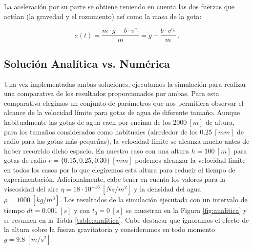 \documentclass[journal]{IEEEtran}
\begin{document}
La aceleración por su parte se obtiene teniendo en cuenta las dos fuerzas que actúan (la gravedad y el rozamiento) así como la masa de la gota:

\begin{equation}
  a(t) = \displaystyle\frac{m\cdot g - b \cdot v^{v_e}}{m} = g - \displaystyle\frac{b\cdot v^{v_e}}{m}~.
\end{equation}

\subsection{Solución Analítica vs. Numérica}

Una vez implementadas ambas soluciones, ejecutamos la simulación para realizar una comparativa de los resultados proporcionados por ambas. Para esta comparativa elegimos un conjunto de parámetros que nos permitiera observar el alcance de la velocidad límite para gotas de agua de diferente tamaño. Aunque habitualmente las gotas de agua caen por encima de los $2000~[m]$ de altura, para los tamaños considerados como habituales \cite{Laws}\cite{Corbert} (alrededor de los $0.25~[mm]$ de radio para
las gotas más pequeñas), la
velocidad límite se alcanza mucho antes de haber recorrido dicho espacio. En nuestro caso con una altura $h = 100~[m]$ para gotas de radio $r = \{0.15, 0.25, 0.30\}~[mm]$ podemos alcanzar la velocidad límite en todos los casos por lo que elegiremos esta altura para reducir el tiempo de experimentación. Adicionalmente, cabe tener en cuenta los valores para la viscosidad del aire $\eta = 18\cdot10^{-16}~[Ns/m^2]$ y la densidad del agua $\rho = 1000~[kg/m^3]$. Los resultados de la simulación ejecutada con un intervalo de tiempo $dt = 0.001~[s]$ y con $t_0 =
0~[s]$ se muestran en la Figura \ref{fig:analitica} y se resumen en la Tabla \ref{table:analitica}. Cabe destacar que ignoramos el efecto de la altura sobre la fuerza gravitatoria y consideramos en todo momento $g = 9.8~[m/s^2]$.
\end{document}
